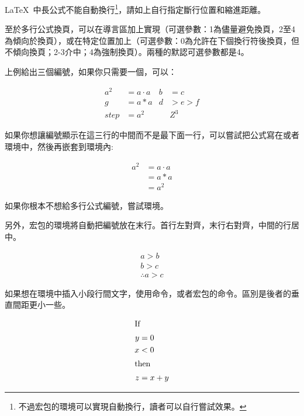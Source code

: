 \LaTeX\ 中長公式不能自動換行\footnote{不過宏包的環境可以實現自動換行，讀者可以自行嘗試效果。}，請如上自行指定斷行位置和縮進距離。

至於多行公式換頁，可以在導言區加上實現（可選參數：1為儘量避免換頁，2至4為傾向於換頁），或在特定位置加上（可選參數：0為允許在下個換行符後換頁，但不傾向換頁；2-3介中；4為強制換頁）。兩種的默認可選參數都是4。

上例給出三個編號，如果你只需要一個，可以：

\begin{codeshow}
\begin{align}
  a^2&= a\cdot a& b&=c\nonumber\\
  g  &= a*a & d&>e>f  \nonumber\\
  step&= a^2 & &Z^3
\end{align}
\end{codeshow}

如果你想讓編號顯示在這三行的中間而不是最下面一行，可以嘗試把公式寫在或者環境中，然後再嵌套到環境內:

\begin{codeshow}
\begin{equation}
  \begin{aligned}
    a^2  &= a\cdot a \\
         &= a*a      \\
         &= a^2
  \end{aligned}
\end{equation}
\end{codeshow}

如果你根本不想給多行公式編號，嘗試環境。

另外，宏包的環境將自動把編號放在末行。首行左對齊，末行右對齊，中間的行居中。
\begin{codeshow}
\begin{multline}
a>b \\
b>c \\
\therefore a>c
\end{multline}
\end{codeshow}

如果想在環境中插入小段行間文字，使用命令，或者宏包的命令。區別是後者的垂直間距更小一些。

\begin{codeshow}
\begin{align*}
\shortintertext{If}
 y &= 0 \\
 x &< 0\\
\shortintertext{then}
 z &= x+y
\end{align*}
\end{codeshow}

